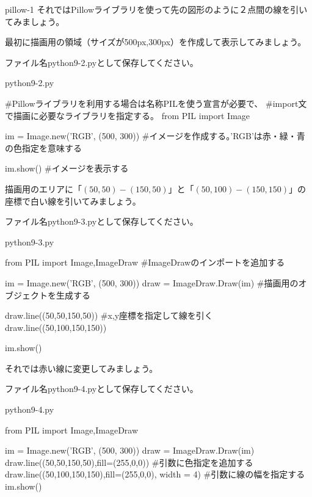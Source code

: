 \documentclass[11pt,a4paper,dvipdfmx,titlepage]{jsreport}
\begin{document}
\begin{pabox}{pillow-1}
それではPillowライブラリを使って先の図形のように２点間の線を引いてみましょう。

最初に描画用の領域（サイズが500px,300px）を作成して表示してみましょう。

ファイル名python9-2.pyとして保存してください。
\begin{codebox}{python9-2.py}
\begin{listing}{1}
#Pillowライブラリを利用する場合は名称PILを使う宣言が必要で、
#import文で描画に必要なライブラリを指定する。
from PIL import Image

im = Image.new('RGB', (500, 300)) #イメージを作成する。'RGB'は赤・緑・青の色指定を意味する

im.show() #イメージを表示する
\end{listing}
\end{codebox}

描画用のエリアに「$(50,50)-(150,50)$」と「$(50,100)-(150,150)$」の座標で白い線を引いてみましょう。


ファイル名python9-3.pyとして保存してください。
\begin{codebox}{python9-3.py}
\begin{listing}{1}
from PIL import Image,ImageDraw #ImageDrawのインポートを追加する

im = Image.new('RGB', (500, 300))
draw = ImageDraw.Draw(im) #描画用のオブジェクトを生成する

draw.line((50,50,150,50)) #x,y座標を指定して線を引く 
draw.line((50,100,150,150))

im.show()
\end{listing}
\end{codebox}

それでは赤い線に変更してみましょう。

ファイル名python9-4.pyとして保存してください。
\begin{codebox}{python9-4.py}
\begin{listing}{1}
from PIL import Image,ImageDraw

im = Image.new('RGB', (500, 300))
draw = ImageDraw.Draw(im)
draw.line((50,50,150,50),fill=(255,0,0)) #引数に色指定を追加する
draw.line((50,100,150,150),fill=(255,0,0), width = 4)
  #引数に線の幅を指定する
im.show()
\end{listing}
\end{codebox}
\end{pabox}
\end{document}
